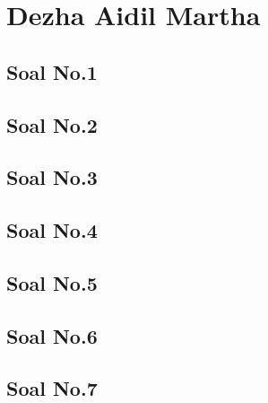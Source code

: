 \section{Dezha Aidil Martha}
\begin{enumerate}

\subsection{Soal No.1}


\subsection{Soal No.2}


\subsection{Soal No.3}


\subsection{Soal No.4}


\subsection{Soal No.5}


\subsection{Soal No.6}


\subsection{Soal No.7}



\end{enumerate}
